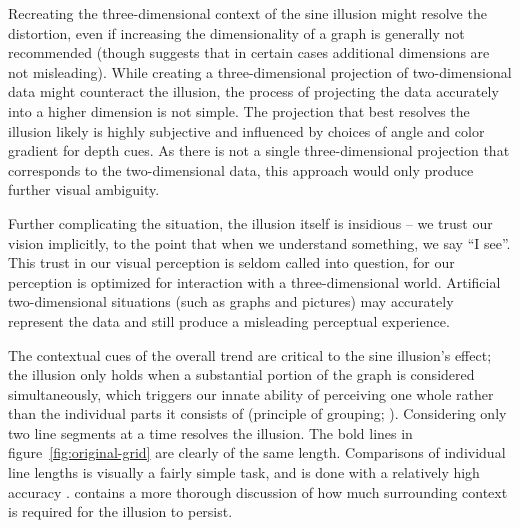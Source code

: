 \documentclass[11pt]{isuthesis}\usepackage[]{graphicx}\usepackage[]{color}
\begin{document}
Recreating the three-dimensional context of the sine illusion might resolve the distortion, even if increasing the dimensionality of a graph is generally not recommended \citep{tufte, cleveland:1984} (though \citet{spence:1990} suggests that in certain cases additional dimensions are not misleading). While creating a three-dimensional projection of two-dimensional data might counteract the illusion, the process of projecting the data accurately into a higher dimension is not simple. The projection that best resolves the illusion likely is highly subjective and influenced by choices of angle and color gradient for depth cues. As there is not a single three-dimensional projection that corresponds to the two-dimensional data, this approach would only produce further visual ambiguity.

Further complicating the situation, the illusion itself is insidious -- we trust our vision implicitly, to the point that when we understand something, we say ``I see''. This trust in our visual perception is seldom called into question, for our perception is optimized for interaction with a three-dimensional world. Artificial two-dimensional situations (such as graphs and pictures) may accurately represent the data and still produce a misleading perceptual experience.

The contextual cues of the overall trend are critical to the sine illusion's effect;  the illusion  only  holds when a substantial portion of the graph is considered simultaneously, which triggers our innate ability of perceiving one whole rather than the individual parts it consists of (principle of grouping; \citet{wolfe2012sensation}).
Considering only two line segments at a time resolves the illusion. The bold lines in figure~\ref{fig:original-grid} are clearly of the same length.  Comparisons of individual line lengths is visually a fairly simple task, and is done with a relatively high accuracy \citep{cleveland:1984}. 
\citet{day:1991} contains a more thorough discussion of how much surrounding context is required for the illusion to persist. 
\end{document}

